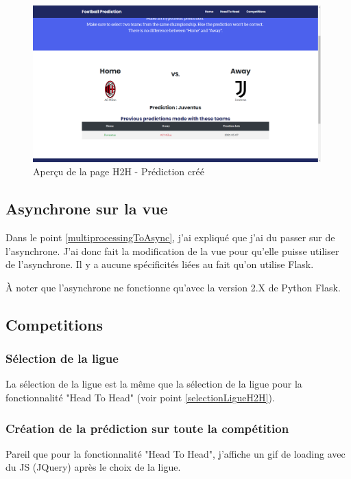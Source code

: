 \documentclass[a4paper,14pt]{extarticle}
\begin{document}
{\begin{figure}[htp]
    \centering
    \includegraphics[width=30em]{../img/predictionMadeH2H.png}
    \caption{Aperçu de la page H2H - Prédiction créé}
    \label{fig:predictionMadeH2H}
\end{figure}

\newpage

\subsection{Asynchrone sur la vue}

Dans le point \ref{multiprocessingToAsync}, j'ai expliqué que j'ai du passer sur de l'asynchrone. J'ai donc fait la modification de la vue pour qu'elle puisse utiliser de l'asynchrone. Il y a aucune spécificités liées au fait qu'on utilise Flask.

À noter que l'asynchrone ne fonctionne qu'avec la version 2.X de Python Flask.

\subsection{Competitions}

\subsubsection{Sélection de la ligue}

La sélection de la ligue est la même que la sélection de la ligue pour la fonctionnalité "Head To Head" (voir point \ref{selectionLigueH2H}).

\subsubsection{Création de la prédiction sur toute la compétition}

Pareil que pour la fonctionnalité "Head To Head", j'affiche un gif de loading avec du JS (JQuery) après le choix de la ligue.

}
\end{document}

